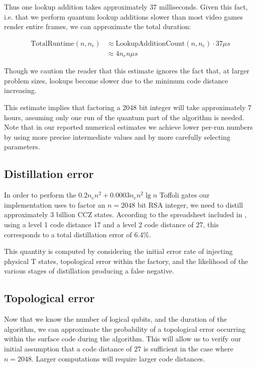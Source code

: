 \documentclass[superscriptaddress,notitlepage,longbibliography]{revtex4-1}
\theoremstyle{definition}
\theoremstyle{definition}
\newcommand{\lenexp}{{n_e}}
\begin{document}
Thus one lookup addition takes approximately 37 milliseconds.
Given this fact, i.e. that we perform quantum lookup additions slower than most video games render entire frames, we can approximate the total duration:

\begin{equation}
\begin{aligned}
    \text{TotalRuntime}(n, \lenexp)
    &\approx \text{LookupAdditionCount}(n, \lenexp) \cdot 37 \mu s
    \\&\approx 4 \lenexp n \mu s
\end{aligned}
\end{equation}

Though we caution the reader that this estimate ignores the fact that, at larger problem sizes, lookups become slower due to the minimum code distance increasing.

This estimate implies that factoring a 2048 bit integer will take approximately 7 hours, assuming only one run of the quantum part of the algorithm is needed.
Note that in our reported numerical estimates we achieve lower per-run numbers by using more precise intermediate values and by more carefully selecting parameters.


\subsection{Distillation error}

In order to perform the $0.2 \lenexp n^2 + 0.0003 \lenexp n^2 \lg n$ Toffoli gates our implementation uses to factor an $n=2048$ bit RSA integer, we need to distill approximately 3 billion CCZ states.
According to the spreadsheet included in \cite{gidney2018magic}, using a level 1 code distance 17 and a level 2 code distance of 27, this corresponds to a total distillation error of 6.4\%.

This quantity is computed by considering the initial error rate of injecting physical T states, topological error within the factory, and the likelihood of the various stages of distillation producing a false negative.

\subsection{Topological error}

Now that we know the number of logical qubits, and the duration of the algorithm, we can approximate the probability of a topological error occurring within the surface code during the algorithm.
This will allow us to verify our initial assumption that a code distance of 27 is sufficient in the case where $n=2048$.
Larger computations will require larger code distances.
\end{document}
